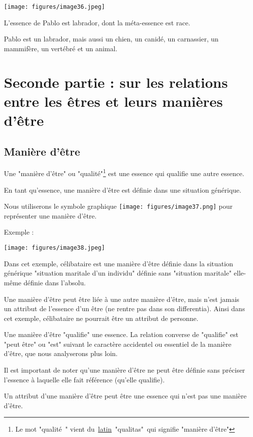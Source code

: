 \documentclass[a4paper, 12pt, openright, french]{book}
\begin{document}
\texttt{[image: figures/image36.jpeg]}

L'essence de Pablo est labrador, dont la méta-essence
est race.

Pablo est un labrador, mais aussi un chien, un canidé, un carnassier, un
mammifère, un vertébré et un animal.

\textsc{\hfill\break
}


\part{Seconde partie : sur les relations entre les êtres et leurs manières d'être}


\chapter{Manière d'être}

Une "manière d'être" ou "qualité"\footnote{Le mot "qualité~" vient
	du~\href{https://fr.wikipedia.org/wiki/Latin}{latin}~"qualitas"~qui
	signifie "manière d'être"} est
une essence qui qualifie une autre essence.

En tant qu'essence, une manière d'être
est définie dans une situation générique.

Nous utiliserons le symbole graphique
\texttt{[image: figures/image37.png]}
pour représenter une manière d'être.

Exemple :

\texttt{[image: figures/image38.jpeg]}

Dans cet exemple, célibataire est une manière d'être
définie dans la situation générique "situation maritale
d'un individu" définie sans "situation maritale"
elle-même définie dans l'absolu.

Une manière d'être peut être liée à une autre manière
d'être, mais n'est jamais un attribut de
l'essence d'un être (ne rentre pas dans
son differentia). Ainsi dans cet exemple, célibataire ne pourrait être
un attribut de personne.

Une manière d'être "qualifie" une essence. La relation
converse de "qualifie" est "peut être" ou "est" suivant le caractère
accidentel ou essentiel de la manière d'être, que nous
analyserons plus loin.

Il est important de noter qu'une manière
d'être ne peut être définie sans préciser
l'essence à laquelle elle fait référence
(qu'elle qualifie).

Un attribut d'une manière d'être peut
être une essence qui n'est pas une manière
d'être.
\end{document}
